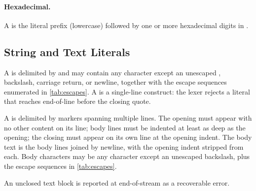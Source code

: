 \paragraph{Hexadecimal.}
A  is the literal prefix  (lowercase) followed by one or more
  hexadecimal digits in \ff{[0-9a-fA-F]}.

\subsection{String and Text Literals}\label{sec:lexical:strings}

A  is delimited by  and may contain any character except an
  unescaped , backslash, carriage return, or newline,
  together with the escape sequences enumerated in \cref{tab:escapes}.
A  is a single-line construct: the lexer rejects a literal that
  reaches end-of-line before the closing quote.

A  is delimited by  markers spanning multiple lines.
The opening  must appear with no other content on its line;
  body lines must be indented at least as deep as the opening;
  the closing  must appear on its own line at the opening indent.
The body text is the body lines joined by newline, with the opening indent
  stripped from each.
Body characters may be any character except an unescaped backslash,
  plus the escape sequences in \cref{tab:escapes}.

An unclosed text block is reported at end-of-stream as a recoverable error.

